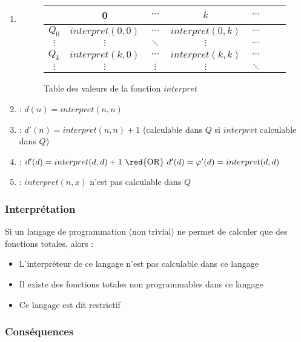 \begin{enumerate}
\item {}
	\begin{figure}[H]
    		\centering
    		\begin{tabular}{c|cccccc}
		 & 0 & $\cdots$ & $k$ & $\cdots$ \\ 
		\hline 
		$Q_0$ & $interpret(0,0)$ & $\cdots$ & $interpret(0,k)$ & $\cdots$ \\
		$\vdots$ & $\vdots$ & $\ddots$ & $\vdots$ & $\cdots$ \\ 
		$Q_k$ & $interpret(k,0)$ & $\cdots$ & $interpret(k,k)$ & $\cdots$ \\ 
		$\vdots$ & $\vdots$ & $\vdots$ & $\vdots$ & $\ddots$ \\ 
		\end{tabular}
		\caption{Table des valeurs de la fonction $interpret$}
	\end{figure}
\item {} : $d(n) = interpret(n,n)$
\item {} : $d'(n)= interpret(n,n) + 1$ (calculable dans $Q$ si $interpret$ calculable dans $Q$)
\item {} : $d'(d)= interpret(d,d) + 1 \text{ \red{OR} } d'(d) = \varphi'(d) = interpret(d,d)$
\item {} : $interpret(n, x)$ n'est pas calculable dans $Q$
\end{enumerate}

\subsubsection{Interprétation}

Si un langage de programmation (non trivial) ne permet de calculer que des fonctions totales, alors :
\begin{itemize}
\item L'interpréteur de ce langage n'est pas calculable dans ce langage
\item Il existe des fonctions totales non programmables dans ce langage
\item Ce langage est dit restrictif
\end{itemize}

\subsubsection{Conséquences}


